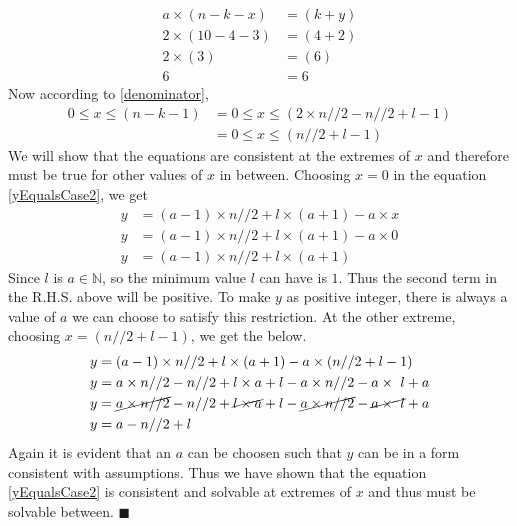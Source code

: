 \documentclass[10pt, twoside]{article}
\begin{document}
\begin{align}
	a \times (n-k-x) &= (k+y) \nonumber \\
	2 \times (10-4-3) &= (4+2) \nonumber \\
	2 \times (3) &= (6) \nonumber \\
	6 &= 6 \nonumber
\end{align}
Now according to \eqref{denominator}, 
\begin{align}
	0 \leq x \leq (n-k-1) &= 0 \leq x \leq (2\times n//2-n//2+l-1) \nonumber \\
	&= 0 \leq x \leq (n//2+l-1) \label{LimitOfXforYEqualsCase2}
\end{align}
We will show that the equations are consistent at the extremes of $x$ and therefore must be true for other values of $x$ in between.\newline
Choosing $x=0$ in the equation \eqref{yEqualsCase2}, we get
\begin{align*}
	y &= (a-1)\times n//2 + l \times (a+1) - a\times x \\
	y &= (a-1)\times n//2 + l \times (a+1) - a\times 0 \\
	y &= (a-1)\times n//2 + l \times (a+1)
\end{align*}
Since $l$ is $a \in \mathbb{N}$, so the minimum value $l$ can have is $1$. Thus the second term in the R.H.S. above will be positive. To make $y$ as positive integer, there is always a value of $a$ we can choose to satisfy this restriction.\newline
At the other extreme, choosing $x=(n//2+l-1)$, we get the below.
\begin{align*}
	y &= (a-1)\times n//2 + l \times (a+1) - a\times (n//2+l-1) \\
	y &= a\times n//2 - n//2 +l\times a +l -a\times n//2-a\times\ l + a \\
	y &= \cancel{a\times n//2} - n//2 +\cancel{l\times a} +l -\cancel{a\times n//2}-\cancel{a\times\ l} + a \\
	y &= a - n//2 + l 
\end{align*}
Again it is evident that an $a$ can be choosen such that $y$ can be in a form consistent with assumptions. Thus we have shown that the equation \eqref{yEqualsCase2} is consistent and solvable at extremes of $x$ and thus must be solvable between. $\blacksquare$
\end{document}
